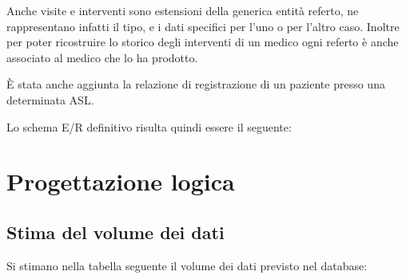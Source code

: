 \documentclass[a4paper,12pt]{report}
\begin{document}
Anche visite e interventi sono estensioni della generica entità referto, ne rappresentano infatti il tipo, e i dati specifici per l'uno o per l'altro caso. Inoltre per
poter ricostruire lo storico degli interventi di un medico ogni referto è anche associato al medico che lo ha prodotto.

È stata anche aggiunta la relazione di registrazione di un paziente presso una determinata ASL.

Lo schema E/R definitivo risulta quindi essere il seguente:
\begin{figure}[p]
\end{figure}

\chapter{Progettazione logica}
\section{Stima del volume dei dati}
Si stimano nella tabella seguente il volume dei dati previsto nel database:
\end{document}
